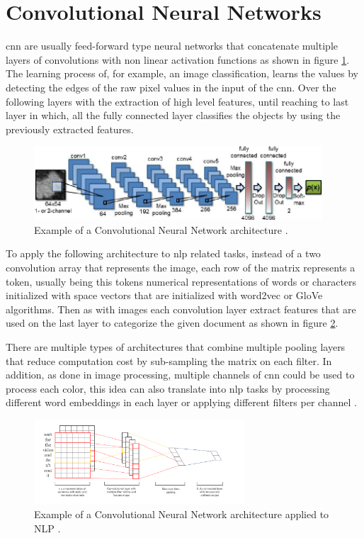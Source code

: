 \section{Convolutional Neural Networks}

\acrlong{cnn} are usually feed-forward type neural networks that concatenate multiple layers of convolutions with non linear activation functions as shown in figure \ref{fig:cnn_architecture}. The learning process of, for example, an image classification, learns the values by detecting the edges of the raw pixel values in the input of the \acrshort{cnn}. Over the following layers with the extraction of high level features, until reaching to last layer in which, all the fully connected layer classifies the objects by using the previously extracted features. 

\begin{figure}[!htp]
  \center
  \includegraphics[width=0.96\textwidth]{figures/cnn_architecture}
  \caption{Example of a Convolutional Neural Network architecture \cite{kooi2017classifying}.}
  \label{fig:cnn_architecture}
\end{figure}

To apply the following architecture to \acrshort{nlp} related tasks, instead of a two convolution array that represents the image, each row of the matrix represents a token, usually being this tokens numerical representations of words or characters initialized with space vectors that are initialized with word2vec or GloVe algorithms. Then as with images each convolution layer extract features that are used on the last layer to categorize the given document as shown in figure \ref{fig:cnn_npl}. 

There are multiple types of architectures that combine multiple pooling layers that reduce computation cost by sub-sampling the matrix on each filter. In addition, as done in image processing, multiple channels of \acrshort{cnn} could be used to process each color, this idea can also translate into \acrshort{nlp} tasks by processing different word embeddings in each layer or applying different filters per channel \cite{singhalborrow}.

\begin{figure}[htbp]
  \center
  \includegraphics[width=0.7\textwidth]{figures/cnn_npl}
  \caption{Example of a Convolutional Neural Network architecture applied to NLP \cite{kim2014convolutional}.}
  \label{fig:cnn_npl}
\end{figure}
